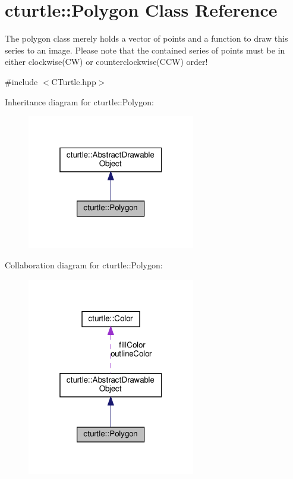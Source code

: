 \hypertarget{classcturtle_1_1Polygon}{}\section{cturtle\+:\+:Polygon Class Reference}
\label{classcturtle_1_1Polygon}


The polygon class merely holds a vector of points and a function to draw this series to an image. Please note that the contained series of points must be in either clockwise(\+C\+W) or counterclockwise(\+C\+C\+W) order!  




{\ttfamily \#include $<$C\+Turtle.\+hpp$>$}



Inheritance diagram for cturtle\+:\+:Polygon\+:
\nopagebreak
\begin{figure}[H]
\begin{center}
\leavevmode
\includegraphics[width=208pt]{classcturtle_1_1Polygon__inherit__graph}
\end{center}
\end{figure}


Collaboration diagram for cturtle\+:\+:Polygon\+:
\nopagebreak
\begin{figure}[H]
\begin{center}
\leavevmode
\includegraphics[width=208pt]{classcturtle_1_1Polygon__coll__graph}
\end{center}
\end{figure}
